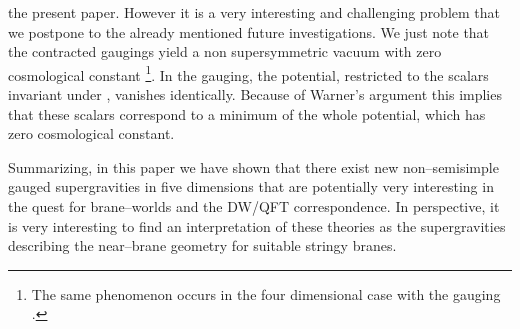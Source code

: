 \documentclass[a4paper,12pt]{article}
\begin{document}
the present paper. However it is a very interesting and
challenging problem that we postpone to the already mentioned
future investigations. We just note that the contracted gaugings
yield a non supersymmetric vacuum with zero cosmological constant
\footnote{The same phenomenon occurs in the four dimensional case
with the \coordHE{} gauging \cite{hull2}.}. In the
\coordHE{} gauging, the potential, restricted to the
scalars invariant under \coordHE{},
vanishes identically. Because of Warner's argument \cite{schur}
this implies  that these scalars correspond to a minimum of the
whole potential, which has zero cosmological constant.
\par
Summarizing, in this paper we have shown that there exist new
non--semisimple gauged supergravities in five dimensions that are
potentially very interesting in the quest for brane--worlds and
the DW/QFT correspondence. In perspective, it is very interesting
to find an interpretation of these theories as the supergravities
describing the near--brane geometry for suitable stringy branes.
\end{document}
